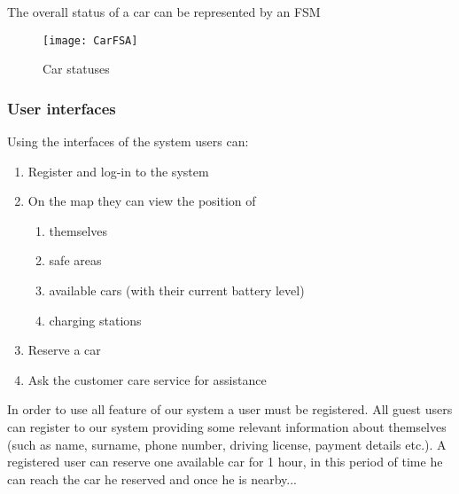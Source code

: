 	The overall status of a car can be represented by an FSM
	\begin{figure}[h]
			\centering
			\texttt{[image: CarFSA]}
			\caption{
				\label{fig:carFSA} 
				Car statuses
			}
		\end{figure}
		
\subsubsection{User interfaces}
	Using the interfaces of the system users can:
	\begin{enumerate}
		\item Register and log-in to the system
		\item On the map they can view the position of
			\begin{enumerate}[label=\alph*)]
				\item themselves
				\item safe areas
				\item available cars (with their current battery level)
				\item charging stations
			\end{enumerate}
		\item Reserve a car
		\item Ask the customer care service for assistance 
	\end{enumerate}


	In order to use all feature of our system a user must be registered. All guest users can register to our system providing some relevant information about themselves (such as name, surname, phone number, driving license, payment details etc.). A registered user can reserve one available car for 1 hour, in this period of time he can reach the car he reserved and once he is nearby...

